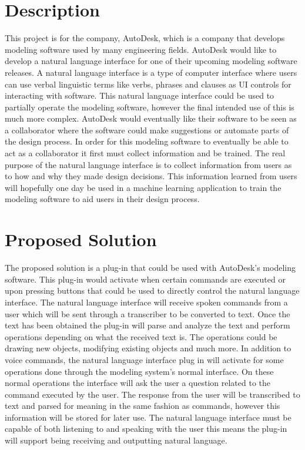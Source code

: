 \documentclass[onecolumn, draftclsnofoot,10pt, compsoc]{IEEEtran}
\begin{document}
\section{Description}
This project is for the company, AutoDesk, which is a company that develops modeling software used by many engineering fields. 
AutoDesk would like to develop a natural language interface for one of their upcoming modeling software releases.
A natural language interface is a type of computer interface where users can use verbal linguistic terms like verbs, phrases and clauses as UI controls for interacting with software.
This natural language interface could be used to partially operate the modeling software, however the final intended use of this is much more complex.
AutoDesk would eventually like their software to be seen as a collaborator where the software could make suggestions or automate parts of the design process. 
In order for this modeling software to eventually be able to act as a collaborator it first must collect information and be trained.
The real purpose of the natural language interface is to collect information from users as to how and why they made design decisions.
This information learned from users will hopefully one day be used in a machine learning application to train the modeling software to aid users in their design process. 
\section{Proposed Solution}
The proposed solution is a plug-in that could be used with AutoDesk's modeling software.
This plug-in would activate when certain commands are executed or upon pressing buttons that could be used to directly control the natural language interface.
The natural language interface will receive spoken commands from a user which will be sent through a transcriber to be converted to text.
Once the text has been obtained the plug-in will parse and analyze the text and perform operations depending on what the received text is.
The operations could be drawing new objects, modifying existing objects and much more.
In addition to voice commands, the natural language interface plug in will activate for some operations done through the modeling system's normal interface.
On these normal operations the interface will ask the user a question related to the command executed by the user.
The response from the user will be transcribed to text and parsed for meaning in the same fashion as commands, however this information will be stored for later use.
The natural language interface must be capable of both listening to and speaking with the user this means the plug-in will support being receiving and outputting natural language.
\end{document}
